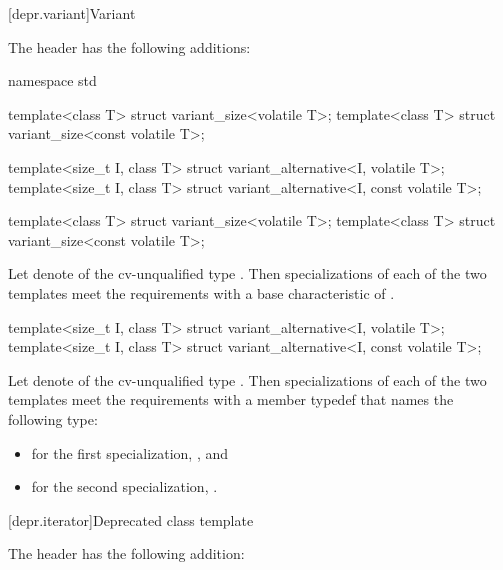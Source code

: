 [depr.variant]{Variant}

\pnum
The header  has the following additions:

\begin{codeblock}
namespace std {
  template<class T> struct variant_size<volatile T>;
  template<class T> struct variant_size<const volatile T>;

  template<size_t I, class T> struct variant_alternative<I, volatile T>;
  template<size_t I, class T> struct variant_alternative<I, const volatile T>;
}
\end{codeblock}

\begin{itemdecl}
template<class T> struct variant_size<volatile T>;
template<class T> struct variant_size<const volatile T>;
\end{itemdecl}

\begin{itemdescr}
\pnum
Let  denote 
of the cv-unqualified type .
Then specializations of each of the two templates meet
the  requirements
with a base characteristic of .
\end{itemdescr}

\begin{itemdecl}
template<size_t I, class T> struct variant_alternative<I, volatile T>;
template<size_t I, class T> struct variant_alternative<I, const volatile T>;
\end{itemdecl}

\begin{itemdescr}
\pnum
Let  denote 
of the cv-unqualified type .
Then specializations of each of the two templates meet
the  requirements
with a member typedef  that names the following type:
\begin{itemize}
\item for the first specialization, , and
\item for the second specialization, .
\end{itemize}
\end{itemdescr}

[depr.iterator]{Deprecated  class template}

\pnum
The header  has the following addition:

